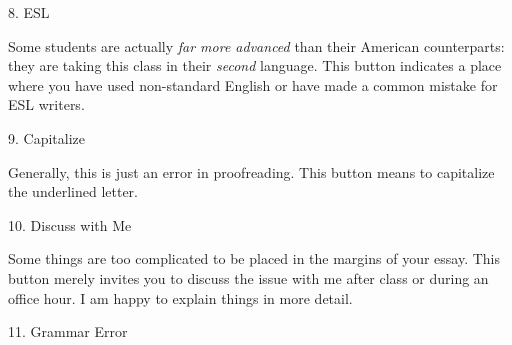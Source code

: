  \begin{center}

\bigskip

{\huge 8. ESL} \end{center}

Some students are actually \emph{far more advanced} than their American
counterparts: they are taking this class in their \emph{second} language. This
button indicates a place where you have used non-standard English or have made a
common mistake for ESL writers.

 \begin{center}
\bigskip

{\huge 9. Capitalize} \end{center}

Generally, this is just an error in proofreading. This button means to
capitalize the underlined letter.

 \begin{center}

\bigskip

{\huge 10. Discuss with Me} \end{center}

Some things are too complicated to be placed in the margins of your essay. This
button merely invites you to discuss the issue with me after class or during an
office hour. I am happy to explain things in more detail.

 \begin{center}

\bigskip

{\huge 11. Grammar Error} \end{center}

